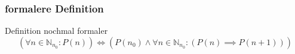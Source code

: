 %
%
%
%




\subsubsection{formalere Definition}
\begin{frame}{Definition nochmal formaler}
    \begin{equation*}
        (\forall n \in \mathbb{N}_{n_0}: P(n)) \iff (P(n_0) \wedge \forall n \in \mathbb{N}_{n_0}: (P(n) \implies P(n+1)))
    \end{equation*}    
\end{frame}

